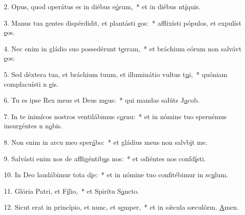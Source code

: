 2. Opus, quod operátus es in diébus e\uline{ó}rum,~* et in diébus nt\uline{í}quis.\par 
3. Manus tua gentes dispérdidit, et plantásti \uline{e}os:~* afflixísti pópulos, et expulíst \uline{e}os.\par 
4. Nec enim in gládio suo possedérunt t\uline{e}rram,~* et bráchium eórum non salvávt \uline{e}os:\par 
5. Sed déxtera tua, et bráchium tuum, et illuminátio vultus t\uline{u}i,~* quóniam complacuísti n \uline{e}is.\par 
6. Tu es ipse Rex meus et Deus m\uline{e}us:~* qui mandas salúts J\uline{a}cob.\par 
7. In te inimícos nostros ventilábimus c\uline{o}rnu:~* et in nómine tuo spernémus insurgéntes n n\uline{o}bis.\par 
8. Non enim in arcu meo sper\uline{á}bo:~* et gládius meus non salvb\uline{i}t me.\par 
9. Salvásti enim nos de affligéntib\uline{u}s nos:~* et odiéntes nos confd\uline{í}sti.\par 
10. In Deo laudábimur tota d\uline{i}e:~* et in nómine tuo confitébimur in sc\uline{u}lum.\par 
11. Glória Patri, et F\uline{í}lio,~* et Spirítu S\uline{a}ncto.\par 
12. Sicut erat in princípio, et nunc, et s\uline{e}mper,~* et in sǽcula sæculórm. \uline{A}men.\par 
